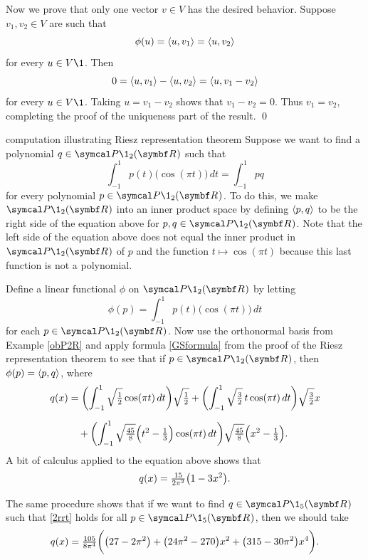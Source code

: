 Now we prove that only one vector $v \in V$ has the desired behavior.  Suppose
$v_1, v_2 \in V$ are such that
\[
\phi(u) = \langle u, v_1\rangle = \langle u, v_2\rangle
\]
for every $u \in V\1$.  Then
\[
0 = \langle u, v_1\rangle - \langle u, v_2\rangle = \langle u, v_1 - v_2\rangle
\]
for every $u \in V\1$.  Taking $u = v_1 - v_2$ shows that $v_1 - v_2 =0$. Thus $v_1 = v_2$, completing the proof of the uniqueness part of the result.
\qed

\begin{example}{computation illustrating Riesz representation theorem}
Suppose we want to find a polynomial $q \in \P\1_2(\R{})$ such that
\begin{equation} \label{2rrt}
\int_{-1}^1 p(t) \bigl(\cos(\pi t)\bigr)\,dt
= \int_{-1}^1 pq
\end{equation}%
for every polynomial $p \in \P\1_2(\R{})$. To do this, we make $\P\1_2(\R{})$ into an inner product space by defining $\langle p, q\rangle$ to be the right side of the equation above for \mbox{$p, q \in \P\1_2(\R{})$}. Note that the left side of the equation above does not equal the inner product in $\P\1_2(\R{})$ of $p$ and the function $t \mapsto \cos(\pi t)$ because this last function is not a polynomial.

Define a linear functional $\phi$ on $\P\1_2(\R{})$ by letting
\[
\phi(p) = \int_{-1}^1 p(t) \bigl(\cos(\pi t)\bigr)\,dt
\]
for each $p \in \P\1_2(\R{})$. Now use the orthonormal basis from Example \ref{obP2R} and apply formula \ref{GSformula} from the proof of the Riesz representation theorem to see that if $p \in \P\1_2(\R{})$, then $\phi(p) = \langle p, q\rangle$, where
\begin{align*}
q(x) &= \paren[\bigg]{ \int_{-1}^1 \sqrt{\tfrac{1}{2}} \cos(\pi t) \, dt } \sqrt{\tfrac{1}{2}} +
 \paren[\bigg]{ \int_{-1}^1 \sqrt{\tfrac{3}{2}} \, t \cos(\pi t) \, dt } \sqrt{\tfrac{3}{2}}x \\[6bp]
 & \quad +
  \paren[\bigg]{ \int_{-1}^1 \sqrt{\tfrac{45}{8}} \paren[\Big]{ t^2 - \tfrac{1}{3} } \cos(\pi t) \, dt } \sqrt{\tfrac{45}{8}}\paren[\Big]{ x^2 - \tfrac{1}{3} }.
\end{align*}
A bit of calculus applied to the equation above shows that
\[
q(x) = \tfrac{15}{2 \pi^2} \paren[\big]{1 - 3 x^2}.
\]

The same procedure shows that if we want to find $q \in \P\1_5(\R{})$ such that \ref{2rrt} holds for all $p \in \P\1_5(\R{})$, then we should take
\[
q(x) = \tfrac{105}{8 \pi^4} \paren[\bigg]{ \paren[\big]{27 - 2 \pi^2} + \paren[\big]{24 \pi^2 - 270} x^2 + \paren[\big]{315 - 30 \pi^2} x^4}.
\]
\exampledisplayend\vspace{4bp}
\end{example}

